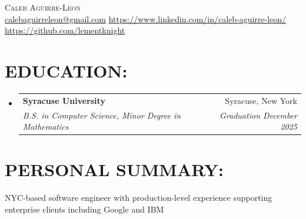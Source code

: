 \documentclass[letterpaper,10pt]{article}
\makeatletter
\newcommand{\resumeEducationHeading}[4]{
  \vspace{-2pt}\item
    \begin{tabular*}{0.97\textwidth}[t]{l@{\extracolsep{\fill}}r}
      \textbf{#1} & #2 \\
      \textit{\small#3} & \textit{\small #4} \\
    \end{tabular*}\vspace{-5pt}
}
\newcommand{\resumeSubHeadingListStart}{\begin{itemize}[leftmargin=0.15in, label={}]}
\newcommand{\resumeSubHeadingListEnd}{\end{itemize}\vspace{-10pt}}
\makeatother
\begin{document}

\begin{center}
    {\Large \textsc{Caleb Aguirre-Leon}} \\ \vspace{3pt}
    \small
    \hspace{.5pt}  \href{mailto:calebaguirreleon@gmail.com}{\faEnvelope  \hspace{0.125em} calebaguirreleon@gmail.com} \quad
    \hspace{.5pt}  \href{https://www.linkedin.com/in/caleb-aguirre-leon/}{\faLinkedin \hspace{0.125em} https://www.linkedin.com/in/caleb-aguirre-leon/} \quad
    \hspace{.5pt}  \href{https://github.com/lementknight}{\faGithub \hspace{0.125em} https://github.com/lementknight}
\end{center}

\section{\textbf{EDUCATION:}}
  \resumeSubHeadingListStart
    \resumeEducationHeading
      {Syracuse University
      }{Syracuse, New York}
      {B.S. in Computer Science, Minor Degree in Mathematics}{Graduation December 2025}
  \resumeSubHeadingListEnd


\section{\textbf{PERSONAL SUMMARY:}}
  \vspace{2pt}
  \resumeSubHeadingListStart
    \small{\item{
        {NYC-based software engineer with production-level experience supporting enterprise clients including Google and IBM} \\ \vspace{3pt}
    }}
  \resumeSubHeadingListEnd

\end{document}
